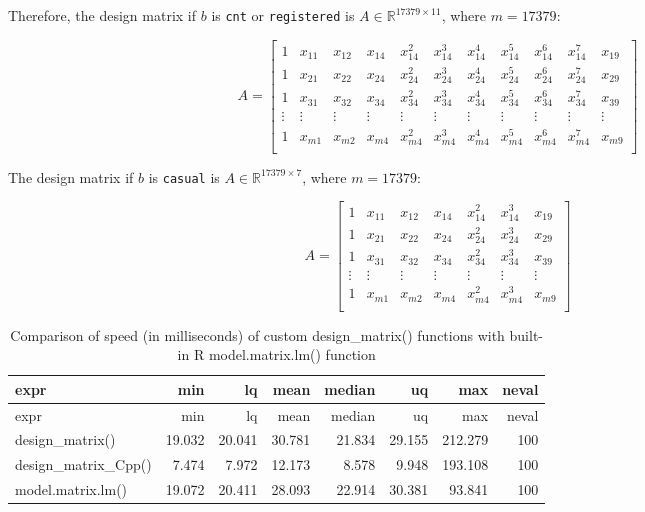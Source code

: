 \documentclass[
]{article}
\begin{document}
Therefore, the design matrix if \(b\) is \texttt{cnt} or
\texttt{registered} is \(A \in \mathbb{R}^{17379 \times 11}\), where
\(m = 17379\):

\[
A=
  \begin{bmatrix}
    1 & x_{11} & x_{12} & x_{14} & x_{14}^{2} & x_{14}^{3} & x_{14}^{4} & x_{14}^{5} & x_{14}^{6} & x_{14}^{7} & x_{19} \\
    1 & x_{21} & x_{22} & x_{24} & x_{24}^{2} & x_{24}^{3} & x_{24}^{4} & x_{24}^{5} & x_{24}^{6} & x_{24}^{7} & x_{29} \\
    1 & x_{31} & x_{32} & x_{34} & x_{34}^{2} & x_{34}^{3} & x_{34}^{4} & x_{34}^{5} & x_{34}^{6} & x_{34}^{7} & x_{39} \\
    \vdots & \vdots & \vdots & \vdots & \vdots & \vdots & \vdots & \vdots & \vdots & \vdots & \vdots \\
    1 & x_{m1} & x_{m2} & x_{m4} & x_{m4}^{2} & x_{m4}^{3} & x_{m4}^{4} & x_{m4}^{5} & x_{m4}^{6} & x_{m4}^{7} & x_{m9} \\
  \end{bmatrix} 
\]

The design matrix if \(b\) is \texttt{casual} is
\(A \in \mathbb{R}^{17379 \times 7}\), where \(m = 17379\):

\[
A=
  \begin{bmatrix}
    1 & x_{11} & x_{12} & x_{14} & x_{14}^{2} & x_{14}^{3} & x_{19} \\
    1 & x_{21} & x_{22} & x_{24} & x_{24}^{2} & x_{24}^{3} & x_{29} \\
    1 & x_{31} & x_{32} & x_{34} & x_{34}^{2} & x_{34}^{3} & x_{39} \\
    \vdots & \vdots & \vdots & \vdots & \vdots & \vdots & \vdots  \\
    1 & x_{m1} & x_{m2} & x_{m4} & x_{m4}^{2} & x_{m4}^{3} & x_{m9} \\
  \end{bmatrix} 
\]

\begin{longtable}[]{@{}lrrrrrrr@{}}
\caption{Comparison of speed (in milliseconds) of custom
design\_matrix() functions with built-in R model.matrix.lm()
function}\tabularnewline
\toprule
expr & min & lq & mean & median & uq & max & neval\tabularnewline
\midrule
\endfirsthead
\toprule
expr & min & lq & mean & median & uq & max & neval\tabularnewline
\midrule
\endhead
design\_matrix() & 19.032 & 20.041 & 30.781 & 21.834 & 29.155 & 212.279
& 100\tabularnewline
design\_matrix\_Cpp() & 7.474 & 7.972 & 12.173 & 8.578 & 9.948 & 193.108
& 100\tabularnewline
model.matrix.lm() & 19.072 & 20.411 & 28.093 & 22.914 & 30.381 & 93.841
& 100\tabularnewline
\bottomrule
\end{longtable}
\end{document}
